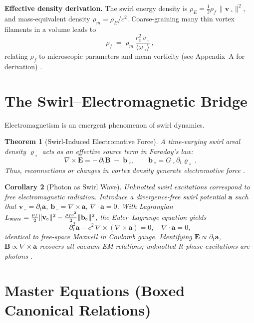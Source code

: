 \documentclass[11pt]{article}
\newtheorem{theorem}{Theorem}[section]
\newtheorem{corollary}[theorem]{Corollary}
\begin{document}
	\textbf{Effective density derivation.} The swirl energy density is $\rho_E=\tfrac12\rho_f\,\|\mathbf{v}_{\!\!\;\circ}\|^2$, and mass-equivalent density $\rho_m=\rho_E/c^2$. Coarse-graining many thin vortex filaments in a volume leads to
	\[
		\rho_f \;=\; \rho_m\,\frac{r_c^2\,v_{\!\!\;\circ}}{\langle \omega_{\!\!\;\circ}\rangle}\,,
	\]
	relating $\rho_f$ to microscopic parameters and mean vorticity (see Appendix~A for derivation) \cite{Iskandarani2025Canon034}.

	\section{The Swirl--Electromagnetic Bridge}

	Electromagnetism is an emergent phenomenon of swirl dynamics.

	\begin{theorem}[Swirl-Induced Electromotive Force]
		A time-varying swirl areal density $\varrho_{\!\!\;\circ}$ acts as an effective source term in Faraday’s law:
		\[
			\nabla \times \mathbf{E} = -\,\partial_t \mathbf{B} \;-\; \mathbf{b}_{\!\!\;\circ}, \qquad \mathbf{b}_{\!\!\;\circ} = G_{\!\!\;\circ}\,\partial_t \varrho_{\!\!\;\circ}\,.
		\]
		Thus, reconnections or changes in vortex density generate electromotive force \cite{Jackson1999,Iskandarani2025MagneticVector}.
	\end{theorem}

	\begin{corollary}[Photon as Swirl Wave]
		Unknotted swirl excitations correspond to free electromagnetic radiation. Introduce a divergence-free swirl potential $\mathbf{a}$ such that
		$\mathbf{v}_{\!\!\;\circ}=\partial_t\mathbf{a}$, $\mathbf{b}_{\!\!\;\circ}=\nabla\times\mathbf{a}$, $\nabla\cdot\mathbf{a}=0$.
		With Lagrangian $L_{\rm wave}=\frac{\rho_f}{2}\|\mathbf{v}_{\!\!\;\circ}\|^2 - \frac{\rho_f c^2}{2}\|\mathbf{b}_{\!\!\;\circ}\|^2$, the Euler--Lagrange equation yields
		\[
			\partial_t^2 \mathbf{a} - c^2\,\nabla\times(\nabla\times \mathbf{a}) = 0,\quad \nabla\cdot\mathbf{a}=0,
		\]
		identical to free-space Maxwell in Coulomb gauge. Identifying $\mathbf{E}\propto\partial_t\mathbf{a}$, $\mathbf{B}\propto \nabla\times\mathbf{a}$ recovers all vacuum EM relations; unknotted R-phase excitations are photons \cite{Jackson1999,Iskandarani2025DoubleSlit}.
	\end{corollary}

	\section{Master Equations (Boxed Canonical Relations)}
\end{document}
